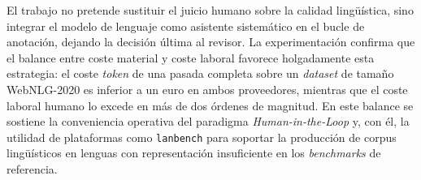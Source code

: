 El trabajo no pretende sustituir el juicio humano sobre la calidad lingüística,
sino integrar el modelo de lenguaje como asistente sistemático en el bucle de
anotación, dejando la decisión última al revisor. La experimentación confirma
que el balance entre coste material y coste laboral favorece holgadamente esta
estrategia: el coste \textit{token} de una pasada completa sobre un
\textit{dataset} de tamaño WebNLG-2020 es inferior a un euro en ambos
proveedores, mientras que el coste laboral humano lo excede en más de dos
órdenes de magnitud. En este balance se sostiene la conveniencia operativa del
paradigma \textit{Human-in-the-Loop} y, con él, la utilidad de plataformas como
\texttt{lanbench} para soportar la producción de corpus lingüísticos en lenguas
con representación insuficiente en los \textit{benchmarks} de referencia.

